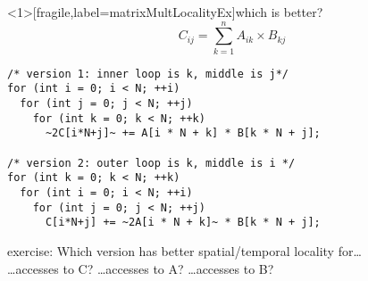 \begin{frame}<1>[fragile,label=matrixMultLocalityEx]{which is better?}
\[ C_{ij} = \sum_{k=1}^n A_{ik}\times B_{kj} \]
\begin{lstlisting}
/* version 1: inner loop is k, middle is j*/
for (int i = 0; i < N; ++i)
  for (int j = 0; j < N; ++j)
    for (int k = 0; k < N; ++k)
      ~2C[i*N+j]~ += A[i * N + k] * B[k * N + j];

/* version 2: outer loop is k, middle is i */
for (int k = 0; k < N; ++k)
  for (int i = 0; i < N; ++i)
    for (int j = 0; j < N; ++j)
      C[i*N+j] += ~2A[i * N + k]~ * B[k * N + j];
\end{lstlisting}
exercise: Which version has better spatial/temporal locality for\ldots \\
\ldots accesses to C?
\ldots accesses to A?
\ldots accesses to B?
\end{frame}
